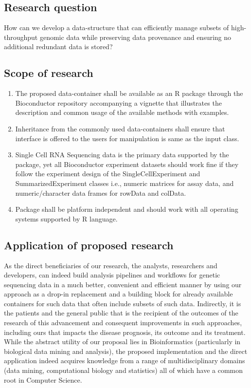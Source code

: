 \documentclass[
]{article}
\providecommand{\tightlist}{%
  \setlength{\itemsep}{0pt}\setlength{\parskip}{0pt}}
\begin{document}
\hypertarget{research-question}{%
\subsection{Research question}\label{research-question}}

How can we develop a data-structure that can efficiently manage subsets
of high-throughput genomic data while preserving data provenance and
ensuring no additional redundant data is stored?

\hypertarget{scope-of-research}{%
\subsection{Scope of research}\label{scope-of-research}}

\begin{enumerate}
\def\labelenumi{\arabic{enumi}.}
\tightlist
\item
  The proposed data-container shall be available as an R package through
  the Bioconductor repository accompanying a vignette that illustrates
  the description and common usage of the available methods with
  examples.
\item
  Inheritance from the commonly used data-containers shall ensure that
  interface is offered to the users for manipulation is same as the
  input class.
\item
  Single Cell RNA Sequencing data is the primary data supported by the
  package, yet all Bioconductor experiment datasets should work fine if
  they follow the experiment design of the SingleCellExperiment and
  SummarizedExperiment classes i.e., numeric matrices for assay data,
  and numeric/character data frames for rowData and colData.
\item
  Package shall be platform independent and should work with all
  operating systems supported by R language.
\end{enumerate}

\hypertarget{application-of-proposed-research}{%
\subsection{Application of proposed
research}\label{application-of-proposed-research}}

As the direct beneficiaries of our research, the analysts, researchers
and developers, can indeed build analysis pipelines and workflows for
genetic sequencing data in a much better, convenient and efficient
manner by using our approach as a drop-in replacement and a building
block for already available containers for such data that often include
subsets of such data. Indirectly, it is the patients and the general
public that is the recipient of the outcomes of the research of this
advancement and consequent improvements in such approaches, including
ours that impacts the disease prognosis, its outcome and its treatment.
While the abstract utility of our proposal lies in Bioinformatics
(particularly in biological data mining and analysis), the proposed
implementation and the direct application indeed acquires knowledge from
a range of multidisciplinary domains (data mining, computational biology
and statistics) all of which have a common root in Computer Science.
\end{document}

